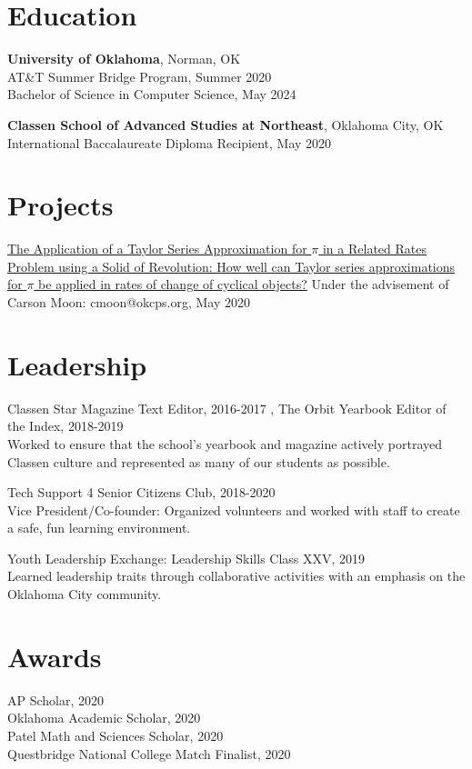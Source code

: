\documentclass[12pt]{article}
\begin{document}
\section*{Education}
\textbf{University of Oklahoma}, Norman, OK \\
AT\&T Summer Bridge Program, Summer 2020 \\
Bachelor of Science in Computer Science, May 2024

\textbf{Classen School of Advanced Studies at Northeast}, Oklahoma City, OK \\
International Baccalaureate Diploma Recipient, May 2020

\section*{Projects}
\href{https://github.com/tttnguyen729/ee}{The Application of a Taylor Series Approximation for \(\pi\) in a Related Rates Problem using a Solid of Revolution: How well can Taylor series approximations for \(\pi\) be applied in rates of change of cyclical objects?} Under the advisement of Carson Moon: cmoon@okcps.org, May 2020 

\section*{Leadership}
Classen Star Magazine Text Editor, 2016-2017 , The Orbit Yearbook Editor of the Index, 2018-2019 \\
Worked to ensure that the school's yearbook and magazine actively portrayed Classen culture and represented as many of our students as possible.

Tech Support 4 Senior Citizens Club, 2018-2020 \\
Vice President/Co-founder: Organized volunteers and worked with staff to create a safe, fun learning environment.

Youth Leadership Exchange: Leadership Skills Class XXV, 2019 \\
Learned leadership traits through collaborative activities with an emphasis on the Oklahoma City community.

\section*{Awards}
AP Scholar, 2020 \\
Oklahoma Academic Scholar, 2020 \\
Patel Math and Sciences Scholar, 2020 \\
Questbridge National College Match Finalist, 2020 
\end{document}
